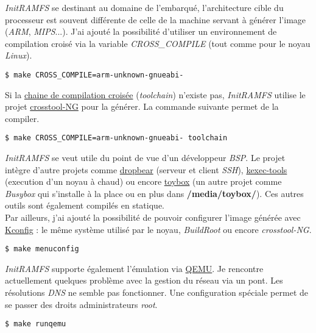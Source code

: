 \documentclass[a4paper]{article}
\begin{document}
\textit{InitRAMFS} se destinant au domaine de l'embarqué, l'architecture cible du processeur est souvent différente de celle de la machine servant à générer l'image (\textit{ARM}, \textit{MIPS}...). J'ai ajouté la possibilité d'utiliser un environnement de compilation croisé via la variable \textit{CROSS\_COMPILE} (tout comme pour le noyau \textit{Linux}).

\begin{verbatim}
$ make CROSS_COMPILE=arm-unknown-gnueabi-
\end{verbatim}

Si la \href{https://fr.wikipedia.org/wiki/Cha\%C3\%AEne_de_compilation}{chaine de compilation croisée} (\textit{toolchain}) n'existe pas, \textit{InitRAMFS} utilise le projet \href{http://crosstool-ng.org/}{crosstool-NG} pour la générer. La commande suivante permet de la compiler.

\begin{verbatim}
$ make CROSS_COMPILE=arm-unknown-gnueabi- toolchain
\end{verbatim}

\textit{InitRAMFS} se veut utile du point de vue d'un développeur \textit{BSP}. Le projet intègre d'autre projets comme \href{https://matt.ucc.asn.au/dropbear/dropbear.html}{dropbear} (serveur et client \textit{SSH}), \href{http://git.kernel.org/cgit/utils/kernel/kexec/kexec-tools.git/}{kexec-tools} (execution d'un noyau à chaud) ou encore \href{http://landley.net/toybox/}{toybox} (un autre projet comme \textit{Busybox} qui s'installe à la place ou en plus dans \textbf{/media/toybox/}). Ces autres outils sont également compilés en statique.\\

Par ailleurs, j'ai ajouté la possibilité de pouvoir configurer l'image générée avec \href{http://ymorin.is-a-geek.org/projects/kconfig-frontends}{Kconfig} : le même système utilisé par le noyau, \textit{BuildRoot} ou encore \textit{crosstool-NG}.

\begin{verbatim}
$ make menuconfig
\end{verbatim}

\textit{InitRAMFS} supporte également l'émulation via \href{http://wiki.qemu.org}{QEMU}. Je rencontre actuellement quelques problème avec la gestion du réseau via un pont. Les résolutions \textit{DNS} ne semble pas fonctionner. Une configuration spéciale permet de se passer des droits administrateurs \textit{root}.

\begin{verbatim}
$ make runqemu
\end{verbatim}
\end{document}
